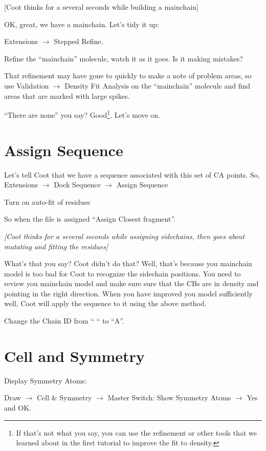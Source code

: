 \documentclass{article}
\begin{document}
\textsf{  [Coot thinks for a several seconds while building a mainchain]}

OK, great, we have a mainchain.  Let's tidy it up:

\textsf{Extensions $\rightarrow$ Stepped Refine}.  

Refine the ``mainchain'' molecule, watch it as it goes.  Is it making
mistakes?

That refinement may have gone to quickly to make a note of problem
areas, so use \textsf{Validation $\rightarrow$ Density Fit Analysis}
on the ``mainchain'' molecule and find areas that are marked with
large spikes.

``There are none'' you say?  Good\footnote{If that's not what you say,
  you can use the refinement or other tools that we learned about in
  the first tutorial to improve the fit to density.}. Let's move on.

\section{Assign Sequence}

Let's tell Coot that we have a sequence associated with this set
of CA points.  So, \textsf{Extensions $\rightarrow$ Dock Sequence
  $\rightarrow$ Assign Sequence}

Turn on auto-fit of residues

So when the file is assigned ``Assign Closest fragment''.

\textsl{ [Coot thinks for a several seconds while assigning
  sidechains, then goes about mutating and fitting the residues]}

What's that you say?  Coot didn't do that?  Well, that's because you
mainchain model is too bad for Coot to recognize the sidechain
positions.  You need to review you mainchain model and make sure sure
that the CBs are in density and pointing in the right direction.  When
you have improved you model sufficiently well, Coot will apply the
sequence to it using the above method.

Change the Chain ID from `` `` to ``A''.

\section{Cell and Symmetry}

Display Symmetry Atoms:

\textsf{Draw $\rightarrow$ Cell \& Symmetry $\rightarrow$ Master
  Switch: Show Symmetry Atoms $\rightarrow$ Yes} and \textsf{OK}.
\end{document}
